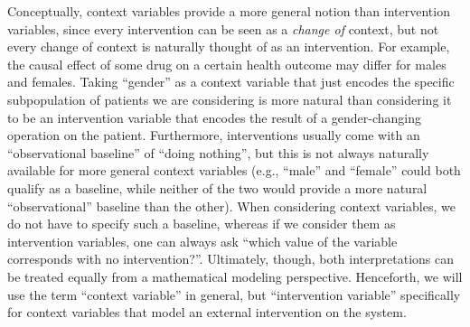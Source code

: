\documentclass[twoside,11pt]{article}
\newcommand{\Joris}[1]{{\color{blue}#1}}
\newcommand{\Tom}[1] {{\color{green}#1}}
\begin{document}
Conceptually, context variables provide a more general notion than intervention variables,
since every intervention can be seen as a \emph{change of} context, but not every change of 
context is naturally thought of as an intervention. For example, the causal effect of some
drug on a certain health outcome may differ for males and females. Taking ``gender'' as 
a context variable that just encodes the specific subpopulation of patients we are considering
is more natural than considering it to be an intervention variable that encodes the
result of a gender-changing operation on the patient. Furthermore, interventions
usually come with an ``observational baseline'' of ``doing nothing'', but this is not always naturally available
for more general context variables (e.g., ``male'' and ``female'' could both qualify as a baseline,
while neither of the two would provide a more natural ``observational'' baseline than the other). 
When considering context variables, we do not
have to specify such a baseline, whereas if we consider them as intervention variables, one can 
always ask ``which value of the variable corresponds with no intervention?''.
Ultimately, though, both interpretations can be treated equally from a mathematical modeling perspective. 
Henceforth, we will use the term ``context variable'' in general, but ``intervention variable'' specifically
for context variables that model an external intervention on the system.
\end{document}
